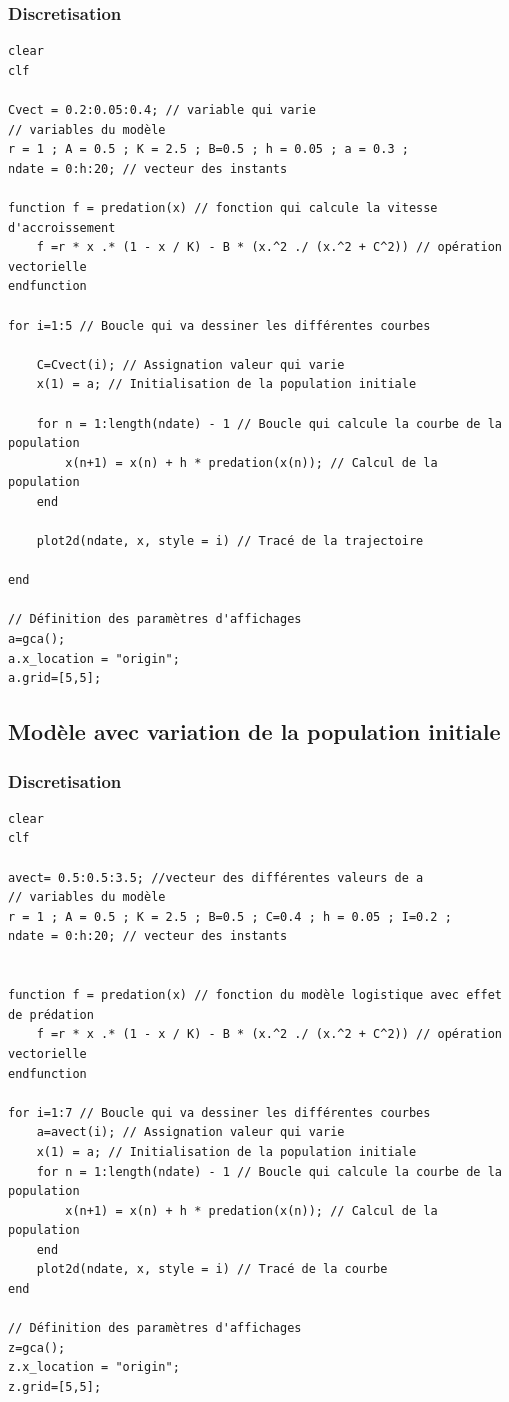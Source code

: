 \documentclass{article}
\begin{document}
\subsubsection{Discretisation}

\begin{verbatim}
clear
clf

Cvect = 0.2:0.05:0.4; // variable qui varie
// variables du modèle
r = 1 ; A = 0.5 ; K = 2.5 ; B=0.5 ; h = 0.05 ; a = 0.3 ;
ndate = 0:h:20; // vecteur des instants

function f = predation(x) // fonction qui calcule la vitesse d'accroissement
    f =r * x .* (1 - x / K) - B * (x.^2 ./ (x.^2 + C^2)) // opération vectorielle
endfunction

for i=1:5 // Boucle qui va dessiner les différentes courbes
    
    C=Cvect(i); // Assignation valeur qui varie
    x(1) = a; // Initialisation de la population initiale
    
    for n = 1:length(ndate) - 1 // Boucle qui calcule la courbe de la population
        x(n+1) = x(n) + h * predation(x(n)); // Calcul de la population
    end
    
    plot2d(ndate, x, style = i) // Tracé de la trajectoire

end

// Définition des paramètres d'affichages
a=gca();
a.x_location = "origin";
a.grid=[5,5];
\end{verbatim}

\subsection{Modèle avec variation de la population initiale}

\subsubsection{Discretisation}

\begin{verbatim}
clear
clf

avect= 0.5:0.5:3.5; //vecteur des différentes valeurs de a
// variables du modèle
r = 1 ; A = 0.5 ; K = 2.5 ; B=0.5 ; C=0.4 ; h = 0.05 ; I=0.2 ;
ndate = 0:h:20; // vecteur des instants


function f = predation(x) // fonction du modèle logistique avec effet de prédation
    f =r * x .* (1 - x / K) - B * (x.^2 ./ (x.^2 + C^2)) // opération vectorielle
endfunction

for i=1:7 // Boucle qui va dessiner les différentes courbes
    a=avect(i); // Assignation valeur qui varie
    x(1) = a; // Initialisation de la population initiale
    for n = 1:length(ndate) - 1 // Boucle qui calcule la courbe de la population
        x(n+1) = x(n) + h * predation(x(n)); // Calcul de la population
    end
    plot2d(ndate, x, style = i) // Tracé de la courbe
end

// Définition des paramètres d'affichages
z=gca();
z.x_location = "origin";
z.grid=[5,5];
\end{verbatim}
\end{document}
